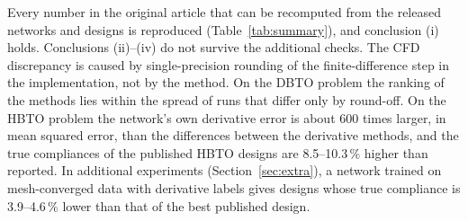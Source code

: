 Every number in the original article that can be recomputed from the released
networks and designs is reproduced (Table~\ref{tab:summary}), and conclusion
(i) holds. Conclusions (ii)--(iv) do not survive the additional checks. The CFD
discrepancy is caused by single-precision rounding of the finite-difference
step in the implementation, not by the method. On the DBTO problem the ranking
of the methods lies within the spread of runs that differ only by round-off.
On the HBTO problem the network's own derivative error is about 600 times
larger, in mean squared error, than the differences between the derivative
methods, and the true compliances of the published HBTO designs are
8.5--10.3\,\% higher than reported. In additional experiments
(Section~\ref{sec:extra}), a network trained on mesh-converged data with
derivative labels gives designs whose true compliance is 3.9--4.6\,\% lower
than that of the best published design.

